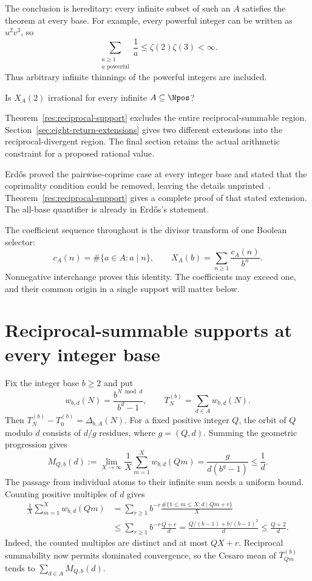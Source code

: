 \documentclass[11pt]{article}
\begin{document}
The conclusion is hereditary: every infinite subset of such an $A$
satisfies the theorem at every base.  For example, every powerful integer
can be written as $u^2v^3$, so
\[
 \sum_{\substack{a\ge1\\a\text{ powerful}}}\frac1a
 \le\zeta(2)\zeta(3)<\infty.
\]
Thus arbitrary infinite thinnings of the powerful integers are included.

\begin{problem}[Erd\H{o}s \#257]\label{res:problem}
Is $X_A(2)$ irrational for every infinite $A\subseteq\Npos$?
\end{problem}
Theorem~\ref{res:reciprocal-support} excludes the entire
reciprocal-summable region.  Section~\ref{sec:eight-return-extensions}
gives two different extensions into the reciprocal-divergent region.
The final section retains the actual arithmetic constraint for a proposed
rational value.

Erd\H{o}s proved the pairwise-coprime case at every integer base and
stated that the coprimality condition could be removed, leaving the details
unprinted~\cite[p.~222]{erdos1968}.  Theorem~\ref{res:reciprocal-support}
gives a complete proof of that stated extension.  The all-base quantifier
is already in Erd\H{o}s's statement.

The coefficient sequence throughout is the divisor transform of one
Boolean selector:
\begin{equation}
 c_A(n)=\#\{a\in A:a\mid n\},\qquad
 X_A(b)=\sum_{n\ge1}\frac{c_A(n)}{b^n}.
 \label{eq:incidence}
\end{equation}
Nonnegative interchange proves this identity.  The coefficients may
exceed one, and their common origin in a single support will matter below.

\section{Reciprocal-summable supports at every integer base}
\label{sec:reciprocal-support}

Fix the integer base $b\ge2$ and put
\[
 w_{b,d}(N)=\frac{b^{N\bmod d}}{b^d-1},\qquad
 T_N^{(b)}=\sum_{d\in A}w_{b,d}(N).
\]
Then $T_N^{(b)}-T_0^{(b)}=\Delta_{b,A}(N)$.
For a fixed positive integer $Q$, the orbit of $Q$ modulo $d$ consists of
$d/g$ residues, where $g=(Q,d)$.  Summing the geometric progression gives
\begin{equation}
 M_{Q,b}(d):=\lim_{X\to\infty}\frac1X\sum_{m=1}^Xw_{b,d}(Qm)
 =\frac{g}{d(b^g-1)}\le\frac1d.
 \label{eq:gcd-orbit-mean}
\end{equation}
The passage from individual atoms to their infinite sum needs a uniform
bound.  Counting positive multiples of $d$ gives
\begin{align*}
 \frac1X\sum_{m=1}^Xw_{b,d}(Qm)
 &=\sum_{r\ge1}b^{-r}
       \frac{\#\{1\le m\le X:d\mid Qm+r\}}X\\
 &\le\sum_{r\ge1}b^{-r}\frac{Q+r}{d}
 =\frac{Q/(b-1)+b/(b-1)^2}{d}\le\frac{Q+2}{d}.
\end{align*}
Indeed, the counted multiples are distinct and at most $QX+r$.
Reciprocal summability now permits dominated convergence, so the Cesaro
mean of $T_{Qm}^{(b)}$ tends to $\sum_{d\in A}M_{Q,b}(d)$.
\end{document}
